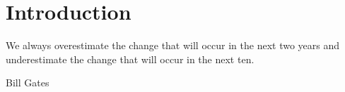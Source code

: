
\chapter{Introduction}
\label{intro}

\epigraph{We always overestimate the change that will occur in the next two years and underestimate the change that will occur in the next ten.}{Bill Gates}

\minitoc

\acresetall












